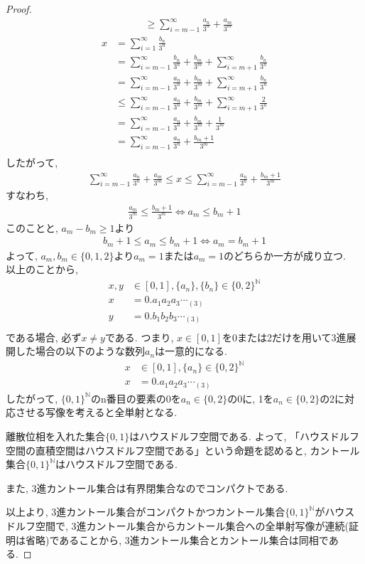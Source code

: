 \documentclass[i]{jsarticle}
\begin{document}
\begin{proof}
\begin{align*}
   &\geq \sum_{i=m-1}^{\infty} \frac{a_n}{3^n} + \frac{a_m}{3^m}
\end{align*}
\begin{align*}
x &= \sum_{i=1}^{\infty} \frac{b_n}{3^n} \\
   &= \sum_{i=m-1}^{\infty} \frac{b_n}{3^n} + \frac{b_m}{3^m} + \sum_{i=m+1}^{\infty} \frac{b_n}{3^n} \\
   &= \sum_{i=m-1}^{\infty} \frac{a_n}{3^n} + \frac{b_m}{3^m} + \sum_{i=m+1}^{\infty} \frac{b_n}{3^n} \\
   &\leq \sum_{i=m-1}^{\infty} \frac{a_n}{3^n} + \frac{b_m}{3^m} + \sum_{i=m+1}^{\infty} \frac{2}{3^n} \\
   &= \sum_{i=m-1}^{\infty} \frac{a_n}{3^n} + \frac{b_m}{3^m} + \frac{1}{3^m} \\
   &= \sum_{i=m-1}^{\infty} \frac{a_n}{3^n} + \frac{b_m+1}{3^m} \\
\end{align*}
したがって,
\begin{align*}
\sum_{i=m-1}^{\infty} \frac{a_n}{3^n} + \frac{a_m}{3^m} \leq x \leq \sum_{i=m-1}^{\infty} \frac{a_n}{3^n} + \frac{b_m+1}{3^m}
\end{align*}
すなわち,
\begin{align*}
\frac{a_m}{3^m} \leq \frac{b_m+1}{3^m} \iff a_m \leq b_m+1
\end{align*}
このことと, $a_{m} - b_{m} \geq 1$より
\begin{align*}
b_m+1 \leq a_m \leq b_m+1 \iff a_m = b_m+1
\end{align*}
よって, $a_m, b_m \in \{0, 1, 2\}$より$a_m=1$または$a_m=1$のどちらか一方が成り立つ.\\
以上のことから,
\begin{align*}
x,y &\in [0, 1], \{a_n\}, \{b_n\} \in \{0, 2\}^{\mathbb{N}} \\
x &= 0.a_{1}a_{2}a_{3}\cdots_{(3)} \\
y &= 0.b_{1}b_{2}b_{3}\cdots_{(3)} \\
\end{align*}
である場合, 必ず$x \neq y$である. つまり, $x \in [0, 1]$を0または2だけを用いて3進展開した場合の以下のような数列${a_n}$は一意的になる.
\begin{align*}
x &\in [0, 1],  \{a_n\} \in \{0, 2\}^{\mathbb{N}} \\
x &= 0.a_{1}a_{2}a_{3}\cdots_{(3)}
\end{align*}
したがって, $\{0, 1\}^{\mathbb{N}}$のn番目の要素の0を$a_n \in \{0, 2\}$の0に, 1を$a_n \in \{0, 2\}$の2に対応させる写像を考えると全単射となる.

離散位相を入れた集合$\{0,1\}$はハウスドルフ空間である. よって, 「ハウスドルフ空間の直積空間はハウスドルフ空間である」という命題を認めると, カントール集合$\{0, 1\}^{\mathbb{N}}$はハウスドルフ空間である.

また, 3進カントール集合は有界閉集合なのでコンパクトである.

以上より, 3進カントール集合がコンパクトかつカントール集合$\{0, 1\}^{\mathbb{N}}$がハウスドルフ空間で, 3進カントール集合からカントール集合への全単射写像が連続(証明は省略)であることから, 3進カントール集合とカントール集合は同相である.
\end{proof}
\end{document}
